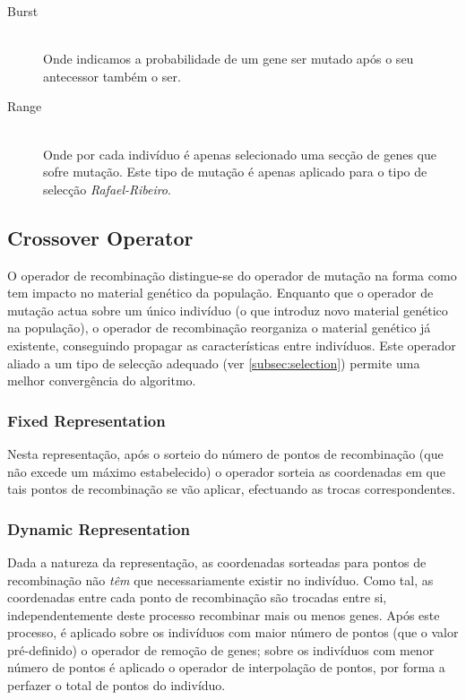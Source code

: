 \documentclass[a4paper]{article}
\begin{document}
\begin{description}
	\item[Burst] \hfill \\ 
		Onde indicamos a probabilidade de um gene ser mutado após o seu antecessor também o ser.

	\item[Range] \hfill \\ 
		Onde por cada indivíduo é apenas selecionado uma secção de genes que sofre mutação.
		Este tipo de mutação é apenas aplicado para o tipo de selecção \emph{Rafael-Ribeiro}.
\end{description}
 
\cleardoublepage
\subsection{Crossover Operator}
\indent \indent O operador de recombinação distingue-se do operador de mutação na forma como tem impacto no material genético da população.
Enquanto que o operador de mutação actua sobre um único indivíduo (o que introduz novo material genético na população),
o operador de recombinação reorganiza o material genético já existente, conseguindo propagar as características entre indivíduos.
Este operador aliado a um tipo de selecção adequado (ver \ref{subsec:selection}) permite uma melhor convergência
do algoritmo.

\subsubsection{Fixed Representation}
\indent \indent Nesta representação, após o sorteio do número de pontos de recombinação (que não excede um máximo estabelecido) o operador
sorteia as coordenadas em que tais pontos de recombinação se vão aplicar, efectuando as trocas correspondentes.

\subsubsection{Dynamic Representation}
\indent \indent Dada a natureza da representação, as coordenadas sorteadas para pontos de recombinação não \emph{têm} que necessariamente existir no indivíduo.
Como tal, as coordenadas entre cada ponto de recombinação são trocadas entre si, independentemente deste processo recombinar mais ou menos genes.
Após este processo, é aplicado sobre os indivíduos com maior número de pontos (que o valor pré-definido) o operador de remoção de genes; sobre os indivíduos com menor
número de pontos é aplicado o operador de interpolação de pontos, por forma a perfazer o total de pontos do indivíduo.
\end{document}
